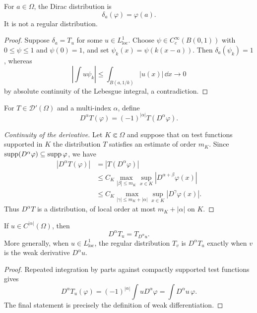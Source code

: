 \begin{noteexample}
For $a\in\Omega$, the Dirac distribution is
\[
  \delta_a(\varphi)=\varphi(a).
\]
It is not a regular distribution.
\end{noteexample}

\begin{proof}
Suppose $\delta_a=T_u$ for some $u\in L^1_{\mathrm{loc}}$.  Choose
$\psi\in C_c^\infty(B(0,1))$ with $0\le\psi\le1$ and $\psi(0)=1$, and set
$\psi_k(x)=\psi(k(x-a))$.  Then $\delta_a(\psi_k)=1$, whereas
\[
  \left|\int u\psi_k\right|
  \le\int_{B(a,1/k)}|u(x)|\,\dd x\longrightarrow0
\]
by absolute continuity of the Lebesgue integral, a contradiction.
\end{proof}

\begin{notedefinition}
For $T\in\mathcal D'(\Omega)$ and a multi-index $\alpha$, define
\[
  D^\alpha T(\varphi)
  =(-1)^{|\alpha|}T(D^\alpha\varphi).
\]
\end{notedefinition}

\begin{proof}[Continuity of the derivative]
Let $K\Subset\Omega$ and suppose that on test functions supported in $K$ the
distribution $T$ satisfies an estimate of order $m_K$.  Since
$\operatorname{supp}(D^\alpha\varphi)\subseteq\operatorname{supp}\varphi$, we have
\[
\begin{aligned}
  |D^\alpha T(\varphi)|
  &=|T(D^\alpha\varphi)| \\
  &\le C_K
      \max_{|\beta|\le m_K}
      \sup_{x\in K}|D^{\alpha+\beta}\varphi(x)| \\
  &\le C_K
      \max_{|\gamma|\le m_K+|\alpha|}
      \sup_{x\in K}|D^\gamma\varphi(x)|.
\end{aligned}
\]
Thus $D^\alpha T$ is a distribution, of local order at most
$m_K+|\alpha|$ on $K$.
\end{proof}

\begin{noteproposition}
If $u\in C^{|\alpha|}(\Omega)$, then
\[
  D^\alpha T_u=T_{D^\alpha u}.
\]
More generally, when $u\in L^1_{\mathrm{loc}}$, the regular distribution
$T_v$ is $D^\alpha T_u$ exactly when $v$ is the weak derivative
$D^\alpha u$.
\end{noteproposition}

\begin{proof}
Repeated integration by parts against compactly supported test functions gives
\[
  D^\alpha T_u(\varphi)
  =(-1)^{|\alpha|}\int uD^\alpha\varphi
  =\int D^\alpha u\,\varphi.
\]
The final statement is precisely the definition of weak differentiation.
\end{proof}
